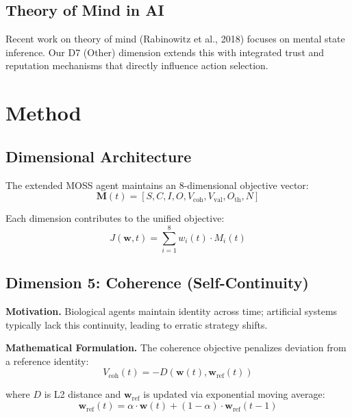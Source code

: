 \documentclass{article}
\begin{document}
\subsection{Theory of Mind in AI}
Recent work on theory of mind (Rabinowitz et al., 2018) focuses on mental state inference. Our D7 (Other) dimension extends this with integrated trust and reputation mechanisms that directly influence action selection.

\section{Method}

\subsection{Dimensional Architecture}

The extended MOSS agent maintains an 8-dimensional objective vector:
\begin{equation}
    \mathbf{M}(t) = [S, C, I, O, V_{\text{coh}}, V_{\text{val}}, O_{\text{th}}, N]
\end{equation}

Each dimension contributes to the unified objective:
\begin{equation}
    J(\mathbf{w}, t) = \sum_{i=1}^{8} w_i(t) \cdot M_i(t)
\end{equation}

\subsection{Dimension 5: Coherence (Self-Continuity)}

\textbf{Motivation.} Biological agents maintain identity across time; artificial systems typically lack this continuity, leading to erratic strategy shifts.

\textbf{Mathematical Formulation.}
The coherence objective penalizes deviation from a reference identity:
\begin{equation}
    V_{\text{coh}}(t) = -D(\mathbf{w}(t), \mathbf{w}_{\text{ref}}(t))
\end{equation}

where $D$ is L2 distance and $\mathbf{w}_{\text{ref}}$ is updated via exponential moving average:
\begin{equation}
    \mathbf{w}_{\text{ref}}(t) = \alpha \cdot \mathbf{w}(t) + (1-\alpha) \cdot \mathbf{w}_{\text{ref}}(t-1)
\end{equation}
\end{document}

